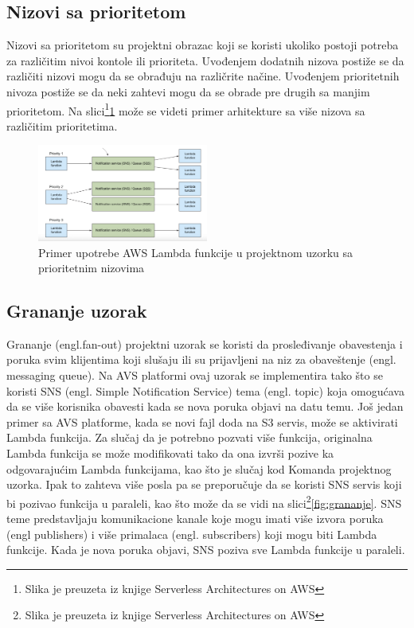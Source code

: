 \documentclass[12pt,oneside]{memoir}
\begin{document}
\subsection{Nizovi sa prioritetom}
Nizovi sa prioritetom su projektni obrazac koji se koristi ukoliko postoji potreba za različitim nivoi kontole ili prioriteta. Uvođenjem dodatnih nizova postiže se da različiti nizovi mogu da se obrađuju na različrite načine. Uvođenjem prioritetnih nivoza postiže se da neki zahtevi mogu da se obrade pre drugih sa manjim prioritetom. Na slici\footnote{Slika je preuzeta iz knjige Serverless Architectures on AWS}\ref{fig:nizovi} može se videti primer arhitekture sa više nizova sa različitim prioritetima.

\begin{figure}[!ht]
  \centering
  \includegraphics[width=0.5\textwidth]{Slika 14.png}
  \caption{Primer upotrebe AWS Lambda funkcije u projektnom uzorku sa prioritetnim nizovima}
  \label{fig:nizovi}
\end{figure}
 
\subsection{Grananje uzorak} %
Grananje (engl.fan-out) projektni uzorak se koristi da prosleđivanje obavestenja i poruka svim klijentima koji slušaju ili su prijavljeni na niz za obaveštenje (engl. messaging queue). Na AVS platformi ovaj uzorak se implementira tako što se koristi SNS (engl. Simple Notification Service) tema (engl. topic) koja omogućava da se više korisnika obavesti kada se nova poruka objavi na datu temu. Još jedan primer sa AVS platforme, kada se novi fajl doda na S3 servis, može se aktivirati Lambda funkcija. Za slučaj da je potrebno pozvati više funkcija, originalna Lambda funkcija se može modifikovati tako da ona izvrši pozive ka odgovarajućim Lambda funkcijama, kao što je slučaj kod Komanda projektnog uzorka. Ipak to zahteva više posla pa se preporučuje da se koristi SNS servis koji bi pozivao funkcija u paraleli, kao što može da se vidi na slici\footnote{Slika je preuzeta iz knjige Serverless Architectures on AWS}\ref{fig:grananje}. SNS teme predstavljaju komunikacione kanale koje mogu imati više izvora poruka (engl publishers) i više primalaca (engl. subscribers) koji mogu biti Lambda funkcije. Kada je nova poruka objavi, SNS poziva sve Lambda funkcije u paraleli.
\end{document}
